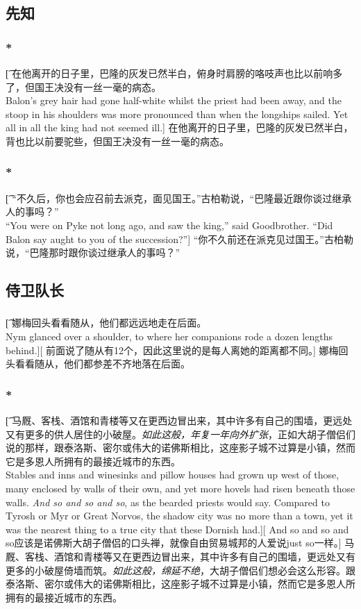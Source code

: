 \documentclass[12pt,a4paper]{article}
\begin{document}
\subsection{先知}
\subsubsection{\color{red}*}\t[
	在他离开的日子里，巴隆的灰发已然半白，俯身时肩膀的咯吱声也比以前响多了，但国王决没有一丝一毫的病态。\\
	Balon's grey hair had gone half-white whilst the priest had been away, and the stoop in his shoulders was more pronounced than when the longships sailed. Yet all in all the king had not seemed ill.]
	在他离开的日子里，巴隆的灰发已然半白，背也比以前要驼些，但国王决没有一丝一毫的病态。
	
\subsubsection{\color{red}*}\t[
	“不久后，你也会应召前去派克，面见国王。”古柏勒说，“巴隆最近跟你谈过继承人的事吗？”\\
	“You were on Pyke not long ago, and saw the king,” said Goodbrother. “Did Balon say aught to you of the succession?”]
	“你不久前还在派克见过国王。”古柏勒说，“巴隆那时跟你谈过继承人的事吗？”
	
\subsection{侍卫队长}
\subsubsection{}\t[
	娜梅回头看看随从，他们都远远地走在后面。\\
	Nym glanced over a shoulder, to where her companions rode a dozen lengths behind.][
	前面说了随从有12个，因此这里说的是每人离她的距离都不同。]
	娜梅回头看看随从，他们都参差不齐地落在后面。
	
\subsubsection{\color{red}*}\t[
	马厩、客栈、酒馆和青楼等又在更西边冒出来，其中许多有自己的围墙，更远处又有更多的供人居住的小破屋。\emph{如此这般，年复一年向外扩张}，正如大胡子僧侣们说的那样，跟泰洛斯、密尔或伟大的诺佛斯相比，这座影子城不过算是小镇，然而它是多恩人所拥有的最接近城市的东西。\\
	Stables and inns and winesinks and pillow houses had grown up west of those, many enclosed by walls of their own, and yet more hovels had risen beneath those walls. \emph{And so and so and so}, as the bearded priests would say. Compared to Tyrosh or Myr or Great Norvos, the shadow city was no more than a town, yet it was the nearest thing to a true city that these Dornish had.][
	And so and so and so应该是诺佛斯大胡子僧侣的口头禅，就像自由贸易城邦的人爱说just so一样。]
	马厩、客栈、酒馆和青楼等又在更西边冒出来，其中许多有自己的围墙，更远处又有更多的小破屋倚墙而筑。\emph{如此这般，绵延不绝}，大胡子僧侣们想必会这么形容。跟泰洛斯、密尔或伟大的诺佛斯相比，这座影子城不过算是小镇，然而它是多恩人所拥有的最接近城市的东西。
	
\end{document}
